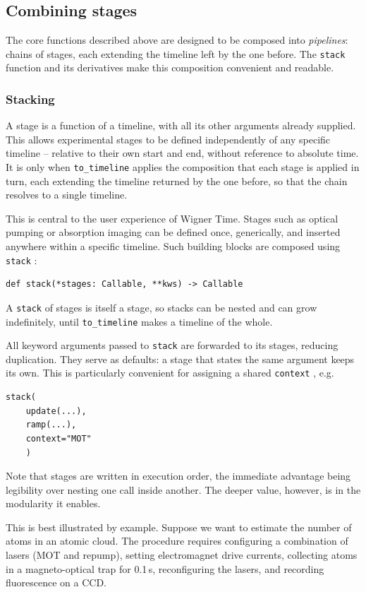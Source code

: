 \documentclass{SciPost}
\newcommand{\python}[1]{%
  \texttt{#1}%
}
\begin{document}
\subsection{Combining stages}
The core functions described above are designed to be composed into \emph{pipelines}: chains of stages, each extending the timeline left by the one before. The \python{stack} function and its derivatives make this composition convenient and readable.

\subsubsection{Stacking}
\label{sec:stacking}
A stage is a function of a timeline, with all its other arguments already supplied. This allows experimental stages to be defined independently of any specific timeline – relative to their own start and end, without reference to absolute time. It is only when \python{to_timeline} applies the composition that each stage is applied in turn, each extending the timeline returned by the one before, so that the chain resolves to a single timeline.

This is central to the user experience of Wigner Time. Stages such as optical pumping or absorption imaging can be defined once, generically, and inserted anywhere within a specific timeline. Such building blocks are composed using \python{stack}:
%
\begin{verbatim}
def stack(*stages: Callable, **kws) -> Callable
\end{verbatim}
%
A \python{stack} of stages is itself a stage, so stacks can be nested and can grow indefinitely, until \python{to_timeline} makes a timeline of the whole.

All keyword arguments passed to \python{stack} are forwarded to its stages, reducing duplication. They serve as defaults: a stage that states the same argument keeps its own. This is particularly convenient for assigning a shared \python{context}, e.g.
\begin{verbatim}
stack(
    update(...),
    ramp(...),
    context="MOT"
    )
\end{verbatim}
%
Note that stages are written in execution order, the immediate advantage being legibility over nesting one call inside another. The deeper value, however, is in the modularity it enables.

This is best illustrated by example. Suppose we want to estimate the number of atoms in an atomic cloud. The procedure requires configuring a combination of lasers (MOT and repump), setting electromagnet drive currents, collecting atoms in a magneto-optical trap for 0.1\,s, reconfiguring the lasers, and recording fluorescence on a CCD.
\end{document}
